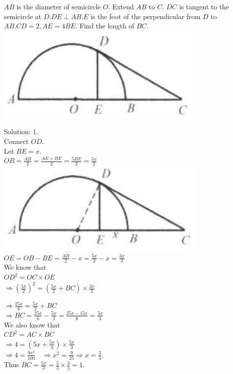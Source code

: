 \documentclass{article}
\begin{document}
\(A B\) is the diameter of semicircle \(O\). Extend \(A B\) to \(C\). \(D C\) is tangent to the semicircle at \(D . D E \perp A B . E\) is the foot of the perpendicular from \(D\) to \(A B . C D=2, A E=4 B E\). Find the length of \(B C\).\\
\centering
\includegraphics[width=\textwidth]{images/152.jpg}

Solution: 1.\\
Connect \(O D\).\\
Let \(B E=x\).\\
\(O B=\frac{A B}{2}=\frac{A E+B E}{2}=\frac{5 B E}{2}=\frac{5 x}{2}\)\\
\centering
\includegraphics[width=\textwidth]{images/152(1).jpg}\\
\(O E=O B-B E=\frac{A B}{2}-x=\frac{5 x}{2}-x=\frac{3 x}{2}\)\\
We know that\\
\(O D^{2}=O C \times O E\)\\
\(\Rightarrow\left(\frac{5 x}{2}\right)^{2}=\left(\frac{5 x}{2}+B C\right) \times \frac{3 x}{2}\)


\(\Rightarrow \frac{25 x}{6}=\frac{5 x}{2}+B C\)\\
\(\Rightarrow B C=\frac{25 x}{6}-\frac{5 x}{2}=\frac{25 x-15 x}{6}=\frac{5 x}{3}\)\\
We also know that\\
\(C D^{2}=A C \times B C\)\\
\(\Rightarrow 4=\left(5 x+\frac{5 x}{3}\right) \times \frac{5 x}{3}\)\\
\(\Rightarrow 4=\frac{9 x^{2}}{100} \quad \Rightarrow x^{2}=\frac{9}{25} \Rightarrow x=\frac{3}{5}\).\\
Thus \(B C=\frac{5 x}{3}=\frac{5}{3} \times \frac{3}{5}=1\).
\end{document}
